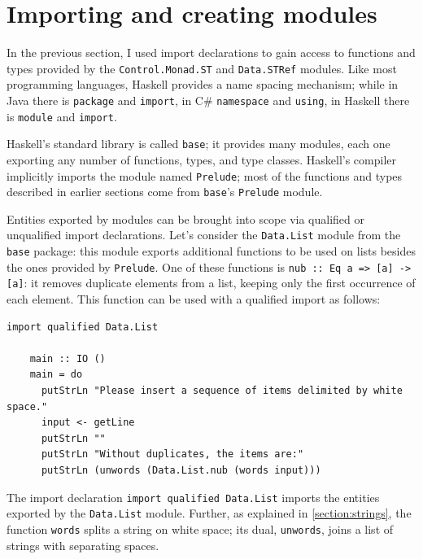 \documentclass[UdineBachThesis,american,11pt]{PhdThesis}
\begin{document}
  \section{Importing and creating modules}

  In the previous section, I used import declarations to gain access to
  functions and types provided by the \mbox{\texttt{Control.Monad.ST}} and
  \mbox{\texttt{Data.STRef}} modules. Like most programming languages, Haskell
  provides a name spacing mechanism; while in Java there is
  \mbox{\texttt{package}} and \mbox{\texttt{import}}, in C\#
  \mbox{\texttt{namespace}} and \mbox{\texttt{using}}, in Haskell there is
  \mbox{\texttt{module}} and \mbox{\texttt{import}}.

  Haskell's standard library is called \mbox{\texttt{base}}; it provides many
  modules, each one exporting any number of functions, types, and type classes.
  Haskell's compiler implicitly imports the module named
  \mbox{\texttt{Prelude}}; most of the functions and types described in earlier
  sections come from \mbox{\texttt{base}}'s \mbox{\texttt{Prelude}} module.

  Entities exported by modules can be brought into scope via qualified or
  unqualified import declarations. Let's consider the \mbox{\texttt{Data.List}}
  module from the \mbox{\texttt{base}} package: this module exports additional
  functions to be used on lists besides the ones provided by
  \mbox{\texttt{Prelude}}. One of these functions is
  \mbox{\texttt{nub :: Eq a => [a] -> [a]}}: it removes duplicate elements from
  a list, keeping only the first occurrence of each element. This function can
  be used with a qualified import as follows:

  \pagebreak

  \begin{Verbatim}[gobble=4,fontsize=\small]
    import qualified Data.List

    main :: IO ()
    main = do
      putStrLn "Please insert a sequence of items delimited by white space."
      input <- getLine
      putStrLn ""
      putStrLn "Without duplicates, the items are:"
      putStrLn (unwords (Data.List.nub (words input)))
  \end{Verbatim}

  The import declaration \mbox{\texttt{import qualified Data.List}} imports the
  entities exported by the \mbox{\texttt{Data.List}} module. Further, as
  explained in \autoref{section:strings}, the function \mbox{\texttt{words}}
  splits a string on white space; its dual, \mbox{\texttt{unwords}}, joins a
  list of strings with separating spaces.
\end{document}
